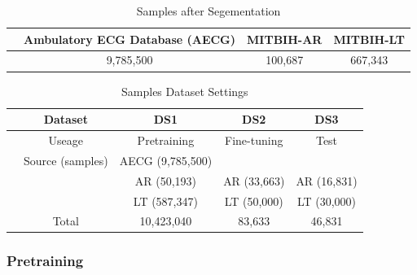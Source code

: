 \documentclass[journal]{IEEEtran}
\begin{document}
\begin{table}[!htbp]
\begin{center}
\begin{threeparttable}
\caption{Samples after Segementation}

\label{table2}
\begin{tabular}{cccc}
\hline
& Ambulatory ECG Database (AECG) & MITBIH-AR &  MITBIH-LT\\
\hline
& 9,785,500 & 100,687 &  667,343 \\
\hline
\end{tabular}
\end{threeparttable}
\end{center}
\end{table}
     
\begin{table}[!htbp]
\begin{center}
\begin{threeparttable}
\caption{Samples Dataset Settings}
\label{table3}
\begin{tabular}{ccccc}
\hline
& Dataset & DS1& DS2    &  DS3\\
\hline
& Useage  & Pretraining & Fine-tuning & Test \\
\hline
& Source (samples) & AECG (9,785,500)   &  &   \\
&  & AR (50,193)   & AR (33,663) & AR (16,831) \\
&  & LT (587,347)  & LT (50,000) & LT (30,000) \\
\hline
&Total & 10,423,040 & 83,633 & 46,831 \\
\hline
\end{tabular}
\end{threeparttable}
\end{center}
\end{table}

\subsubsection{Pretraining}
\end{document}
